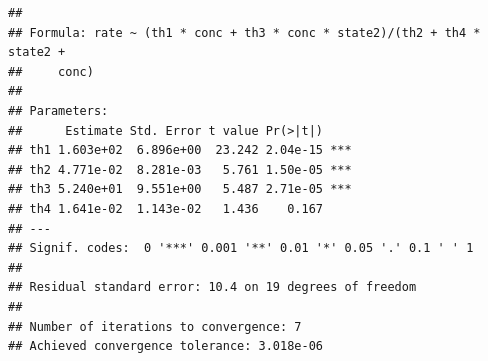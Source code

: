 \documentclass[
]{article}
\begin{document}
\begin{verbatim}
## 
## Formula: rate ~ (th1 * conc + th3 * conc * state2)/(th2 + th4 * state2 + 
##     conc)
## 
## Parameters:
##      Estimate Std. Error t value Pr(>|t|)    
## th1 1.603e+02  6.896e+00  23.242 2.04e-15 ***
## th2 4.771e-02  8.281e-03   5.761 1.50e-05 ***
## th3 5.240e+01  9.551e+00   5.487 2.71e-05 ***
## th4 1.641e-02  1.143e-02   1.436    0.167    
## ---
## Signif. codes:  0 '***' 0.001 '**' 0.01 '*' 0.05 '.' 0.1 ' ' 1
## 
## Residual standard error: 10.4 on 19 degrees of freedom
## 
## Number of iterations to convergence: 7 
## Achieved convergence tolerance: 3.018e-06
\end{verbatim}

  
\end{document}
